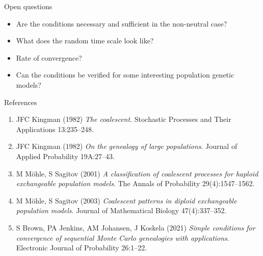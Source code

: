 \documentclass[aspectratio=169]{beamer}
\theoremstyle{definition}
\begin{document}



\begin{frame}{Open questions}
\begin{itemize}
\item Are the conditions necessary and sufficient in the non-neutral case?
\item What does the random time scale look like?
\item Rate of convergence?
\item Can the conditions be verified for some interesting population genetic models?
\end{itemize}
\end{frame}


\begin{frame}{References}
\begin{enumerate}
\item JFC Kingman (1982) \textit{The coalescent}. Stochastic Processes and Their Applications 13:235--248.
\item JFC Kingman (1982) \textit{On the genealogy of large populations}. Journal of Applied Probability 19A:27--43.
\item M M\"ohle, S Sagitov (2001) \textit{A classification of coalescent processes for haploid exchangeable population models}. The Annals of Probability 29(4):1547--1562.
\item M M\"ohle, S Sagitov (2003) \textit{Coalescent patterns in diploid exchangeable population models}. Journal of Mathematical Biology 47(4):337--352.
\item S Brown, PA Jenkins, AM Johansen, J Koskela (2021) \textit{Simple conditions for convergence of sequential Monte Carlo genealogies with applications}. Electronic Journal of Probability 26:1--22.
\end{enumerate}
\end{frame}
\end{document}
